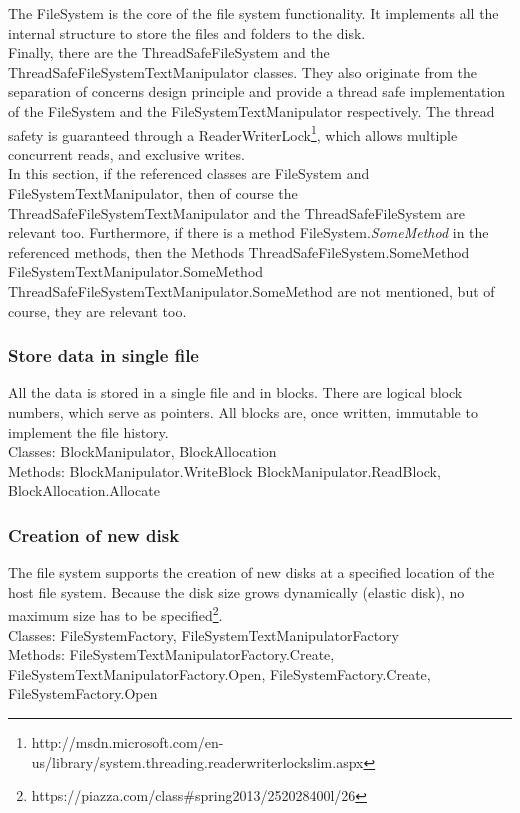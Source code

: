 \documentclass[JCDReport.tex]{subfiles}
\begin{document}
The FileSystem is the core of the file system functionality. It implements all the internal structure to store the files and folders to the disk.\\
Finally, there are the ThreadSafeFileSystem and the ThreadSafeFileSystemTextManipulator classes. They also originate from the separation of concerns design principle and provide a thread safe implementation of the FileSystem and the FileSystemTextManipulator respectively. The thread safety is guaranteed through a ReaderWriterLock\footnote{http://msdn.microsoft.com/en-us/library/system.threading.readerwriterlockslim.aspx}, which allows multiple concurrent reads, and exclusive writes.\\

In this section, if the referenced classes are FileSystem and FileSystemTextManipulator, then of course the ThreadSafeFileSystemTextManipulator and the ThreadSafeFileSystem are relevant too. Furthermore, if there is a method FileSystem.\textit{SomeMethod} in the referenced methods, then the Methods ThreadSafeFileSystem.SomeMethod FileSystemTextManipulator.SomeMethod ThreadSafeFileSystemTextManipulator.SomeMethod are not mentioned, but of course, they are relevant too.

\subsubsection{Store data in single file}
All the data is stored in a single file and in blocks. There are logical block numbers, which serve as pointers. All blocks are, once written, immutable to implement the file history.\\
Classes: BlockManipulator, BlockAllocation\\
Methods: BlockManipulator.WriteBlock BlockManipulator.ReadBlock, BlockAllocation.Allocate

\subsubsection{Creation of new disk}
The file system supports the creation of new disks at a specified location of the host file system. Because the disk size grows dynamically (elastic disk), no maximum size has to be specified\footnote{https://piazza.com/class\#spring2013/252028400l/26}.\\
Classes: FileSystemFactory, FileSystemTextManipulatorFactory\\
Methods: FileSystemTextManipulatorFactory.Create, FileSystemTextManipulatorFactory.Open, FileSystemFactory.Create, FileSystemFactory.Open
\end{document}
